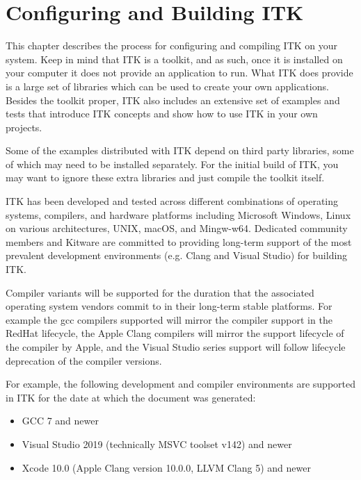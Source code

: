\chapter{Configuring and Building ITK}%
\label{chapter:Installation}

This chapter describes the process for configuring and compiling ITK on your
system. Keep in mind that ITK is a toolkit, and as such, once it is installed
on your computer it does not provide an application to run. What ITK does
provide is a large set of libraries which can be used to create your own
applications. Besides the toolkit proper, ITK also includes an extensive set of
examples and tests that introduce ITK concepts and show how to use ITK in your
own projects.

Some of the examples distributed with ITK depend on third party libraries, some
of which may need to be installed separately. For the initial build of ITK, you
may want to ignore these extra libraries and just compile the toolkit itself.

ITK has been developed and tested across different combinations of operating
systems, compilers, and hardware platforms including Microsoft Windows, Linux on
various architectures, UNIX, macOS, and Mingw-w64. Dedicated community members and
Kitware are committed to providing long-term support of the most prevalent
development environments (e.g. Clang and Visual Studio) for building ITK.

Compiler variants will be supported for the duration that the associated operating
system vendors commit to in their long-term stable platforms. For example the gcc
compilers supported will mirror the compiler support in the RedHat lifecycle, the
Apple Clang compilers will mirror the support lifecycle of the compiler by Apple, and
the Visual Studio series support will follow lifecycle deprecation of the compiler
versions.

For example, the following development and compiler environments are supported
in ITK for the date at which the document was generated:
\begin{itemize}
\item GCC 7 and newer
\item Visual Studio 2019 (technically MSVC toolset v142) and newer
\item Xcode 10.0 (Apple Clang version 10.0.0, LLVM Clang 5) and newer
\end{itemize}

